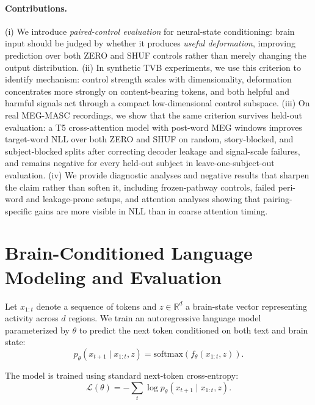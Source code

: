 \documentclass{article}
\theoremstyle{plain}
\theoremstyle{definition}
\theoremstyle{remark}
\begin{document}
\paragraph{Contributions.}
(i) We introduce \emph{paired-control evaluation} for neural-state conditioning: brain input should be judged by whether it produces \emph{useful deformation}, improving prediction over both ZERO and SHUF controls rather than merely changing the output distribution.
(ii) In synthetic TVB experiments, we use this criterion to identify mechanism: control strength scales with dimensionality, deformation concentrates more strongly on content-bearing tokens, and both helpful and harmful signals act through a compact low-dimensional control subspace.
(iii) On real MEG-MASC recordings, we show that the same criterion survives held-out evaluation: a T5 cross-attention model with post-word MEG windows improves target-word NLL over both ZERO and SHUF on random, story-blocked, and subject-blocked splits after correcting decoder leakage and signal-scale failures, and remains negative for every held-out subject in leave-one-subject-out evaluation.
(iv) We provide diagnostic analyses and negative results that sharpen the claim rather than soften it, including frozen-pathway controls, failed peri-word and leakage-prone setups, and attention analyses showing that pairing-specific gains are more visible in NLL than in coarse attention timing.





\section{Brain-Conditioned Language Modeling and Evaluation}

Let $x_{1:t}$ denote a sequence of tokens and $z \in \mathbb{R}^d$ a brain-state vector representing activity across $d$ regions.
We train an autoregressive language model parameterized by $\theta$ to predict the next token conditioned on both text and brain state:
\begin{equation}
p_\theta(x_{t+1} \mid x_{1:t}, z) = \mathrm{softmax}\!\left(f_\theta(x_{1:t}, z)\right).
\end{equation}

The model is trained using standard next-token cross-entropy:
\begin{equation}
\mathcal{L}(\theta) = - \sum_{t} \log p_\theta(x_{t+1} \mid x_{1:t}, z).
\end{equation}
\end{document}
